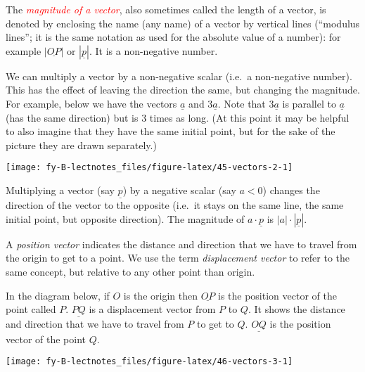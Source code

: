 \documentclass[
  11pt,
  oneside]{book}
\newcommand{\slide}{}
\theoremstyle{definition}
\theoremstyle{definition}
\theoremstyle{definition}
\theoremstyle{definition}
\theoremstyle{remark}
\begin{document}
\slide

The \textcolor{red}{\em magnitude of a vector}, also sometimes called the length of a vector, is denoted by enclosing the name (any name) of a vector by vertical lines (``modulus lines''; it is the same notation as used for the absolute value of a number): for example \(|\underline{OP}|\) or \(|\underline{p}|\). It is a non-negative number.

\slide

We can multiply a vector by a non-negative scalar (i.e.~a non-negative number). This has the effect of leaving the direction the same, but changing the magnitude. For example, below we have the vectors \(\underline a\) and \(3\underline a\). Note that \(3\underline a\) is parallel to \(\underline a\) (has the same direction) but is \(3\) times as long. (At this point it may be helpful to also imagine that they have the same initial point, but for the sake of the picture they are drawn separately.)

\begin{center}\texttt{[image: fy-B-lectnotes\_files/figure-latex/45-vectors-2-1]} \end{center}
\slide

Multiplying a vector (say \(\underline{p}\)) by a negative scalar (say \(a<0\)) changes the direction of the vector to the opposite (i.e.~it stays on the same line, the same initial point, but opposite direction). The magnitude of \(a\cdot\underline{p}\) is \(|a|\cdot |\underline{p}|\).

\slide

A \emph{position vector} indicates the distance and direction that we have to travel from the origin to get to a point. We use the term \emph{displacement vector} to refer to the same concept, but relative to any other point than origin.

In the diagram below, if \(O\) is the origin then \(\underline{OP}\) is the position vector of the point called \(P\). \(\underline{PQ}\) is a displacement vector from \(P\) to \(Q\). It shows the distance and direction that we have to travel from \(P\) to get to \(Q\). \(\underline{OQ}\) is the position vector of the point \(Q\).

\begin{center}\texttt{[image: fy-B-lectnotes\_files/figure-latex/46-vectors-3-1]} \end{center}

\slide
\end{document}
